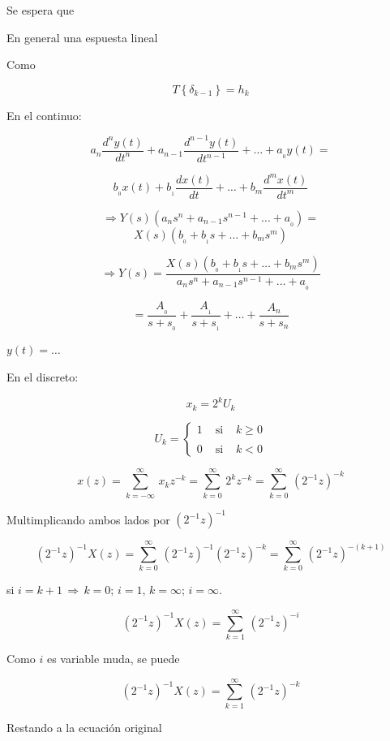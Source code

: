 Se espera que 


En general una espuesta lineal


Como 

$$T\left\lbrace \delta_{k - 1} \right\rbrace = h_{k}$$


En el continuo:

$$a_{n}\dfrac{d^{n}y(t)}{dt^{n}} + a_{n - 1}\dfrac{d^{n - 1}y(t)}{dt^{n - 1}} + \ldots + a_{_0}y(t) = $$

$$b_{_0}x(t) + b_{_1}\dfrac{dx(t)}{dt} + \ldots + b_{m} \dfrac{d^{m}x(t)}{dt^{m}}$$

$$\Rightarrow Y(s)(a_{n}s^{n} + a_{n - 1}s^{n - 1} + \ldots + a_{_0}) = $$
$$X(s)(b_{_0} + b_{_1}s + \ldots + b_{m}s^{m})$$

$$\Rightarrow Y(s) = \dfrac{X(s)(b_{_0} + b_{_1}s + \ldots + b_{m}s^{m})}{a_{n}s^{n} + a_{n - 1}s^{n - 1} + \ldots + a_{_0}}$$

$$= \dfrac{A_{_0}}{s + s_{_0}} + \dfrac{A_{_1}}{s + s_{_1}} + \ldots + \dfrac{A_{n}}{s + s_{n}}$$

$y(t) = \ldots$

En el discreto:

$$x_{k} = 2^k U_{k}$$

\[
U_{k} = \left\{
\begin{array}{lcl}
1 & \mbox{	si } & k\geq 0 \\
  &              &         \\    
0 & \mbox{ si }  & k < 0
\end{array}
\right.
\]

$$x(z) = \sum_{k = -\infty}^{\infty}\, x_{k}z^{-k} = \sum_{k = 0}^{\infty}\, 2^{k}z^{-k} = \sum_{k = 0}^{\infty}\, (2^{-1}z)^{-k}$$

Multimplicando ambos lados por $(2^{-1}z)^{-1}$

$$(2^{-1}z)^{-1} X(z) = \sum_{k = 0}^{\infty}\, (2^{-1}z)^{-1}(2^{-1}z)^{-k} = \sum_{k = 0}^{\infty}\, (2^{-1}z)^{-(k + 1)}$$

si $i = k + 1\, \Rightarrow \, k = 0;\, i = 1,\, k = \infty;\, i = \infty.$ 

$$(2^{-1}z)^{-1} X(z) = \sum_{k = 1}^{\infty}\, (2^{-1}z)^{-i}$$

Como $i$ es variable muda, se puede

$$(2^{-1}z)^{-1} X(z) = \sum_{k = 1}^{\infty}\, (2^{-1}z)^{-k}$$

Restando a la ecuación original

